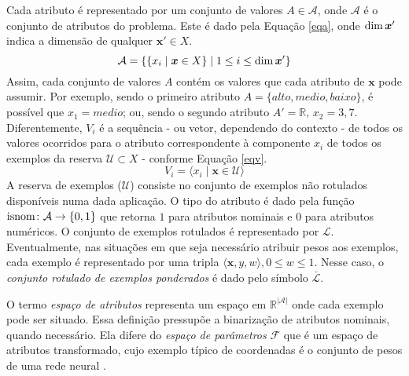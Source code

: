 Cada atributo é representado por um conjunto de valores $A \in \mathcal{A}$, onde $\mathcal{A}$ é o conjunto de atributos do problema.
Este é dado pela Equação \ref{eqa}, onde $\operatorname*{dim}{\bm{x}'}$ indica a dimensão de qualquer $\bm{x}'\in X$.
\begin{equation}\label{eqa}
\mathcal{A} = \{\{x_i \mid \bm{x} \in X\} 
\mid
1 \leq i \leq \operatorname*{dim}{\bm{x}'}\}
\end{equation}
Assim, cada conjunto de valores $A$ contém os valores que cada atributo de $\bm{x}$ pode assumir.
Por exemplo, sendo o primeiro atributo $A=\{\textit{alto},\textit{medio},\textit{baixo}\}$,
é possível que $x_1=medio$; ou, sendo o segundo atributo $A' = \mathbb{R}$, $x_2=3,7$.
Diferentemente, $V_i$ é a 
sequência - ou vetor, dependendo do contexto - de todos os valores ocorridos para o atributo correspondente à componente $x_i$ de todos os exemplos da reserva $\mathcal{U} \subset X$ - conforme Equação \ref{eqv}.
\begin{equation}\label{eqv}
   V_i = \langle x_i \mid \bm{x} \in \mathcal{U} \rangle
\end{equation}
A reserva de exemplos ($\mathcal{U}$) consiste no conjunto de exemplos não rotulados disponíveis numa dada aplicação.
O tipo do atributo é dado pela função $\operatorname*{isnom}\colon \mathcal{A}\rightarrow\{0,1\}$ que retorna $1$ para atributos nominais e $0$ para atributos numéricos.
O conjunto de exemplos rotulados é representado por $\mathcal{L}$.
Eventualmente, nas situações em que seja necessário atribuir pesos aos exemplos, cada exemplo é representado por uma tripla $\langle \bm{x}, y, w \rangle, 0 \leq w \leq 1$.
Nesse caso, o \textit{conjunto rotulado de exemplos ponderados} é dado pelo símbolo $\mathcal{\bar{L}}$.

O termo \textit{espaço de atributos} representa um espaço em $\mathbb{R}^{|\mathcal{A}|}$ onde cada exemplo pode ser situado.
Essa definição pressupõe a binarização de atributos nominais, quando necessário.
Ela difere do \textit{espaço de parâmetros} $\mathcal{F}$ que é um espaço de atributos transformado, cujo exemplo típico de coordenadas é o conjunto de pesos de uma rede neural \cite{haykin2004comprehensive}.

